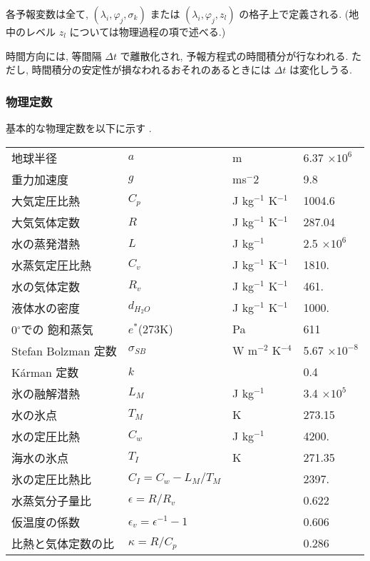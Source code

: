 各予報変数は全て, $(\lambda_i, \varphi_j, \sigma_k)$
または $(\lambda_i, \varphi_j, z_l)$ の格子上で定義される.
(地中のレベル $z_l$ については物理過程の項で述べる.)

時間方向には, 等間隔 $\Delta t$ で離散化され,
予報方程式の時間積分が行なわれる.
ただし, 時間積分の安定性が損なわれるおそれのあるときには
$\Delta t$ は変化しうる.

\subsubsection{物理定数}

基本的な物理定数を以下に示す .

\begin{tabular}{llll}
地球半径         & $a$         & m                    & 6.37 $\times 10^6$ \\
重力加速度       & $g$         & ms$^-2$              & 9.8                \\
大気定圧比熱     & $C_p$       & J kg$^{-1}$ K$^{-1}$ & 1004.6             \\
大気気体定数     & $R$         & J kg$^{-1}$ K$^{-1}$ & 287.04             \\
水の蒸発潜熱     & $L$         & J kg$^{-1}$          & 2.5 $\times 10^6$  \\
水蒸気定圧比熱   & $C_v$       & J kg$^{-1}$ K$^{-1}$ & 1810.              \\
水の気体定数     & $R_v$       & J kg$^{-1}$ K$^{-1}$ & 461.               \\
液体水の密度     & $d_{H_2O}$  & J kg$^{-1}$ K$^{-1}$ & 1000.              \\
0$^{\circ}$での
飽和蒸気         & $e^*$(273K) & Pa                   & 611                \\
Stefan Bolzman
定数             & $\sigma_{SB}$  
                               & W m$^{-2}$ K$^{-4}$  & 5.67 
                                                          $\times 10^{-8}$ \\
K\'{a}rman 定数  & $k$         &                      & 0.4                \\
氷の融解潜熱     & $L_M$       & J kg$^{-1}$          & 3.4 $\times 10^5$  \\
水の氷点         & $T_M$       & K                    & 273.15 \\
水の定圧比熱     & $C_w$       & J kg$^{-1}$          & 4200.  \\
海水の氷点       & $T_I$       & K                    & 271.35 \\
氷の定圧比熱比   & $C_I  = C_w - L_M/T_M$
                               &                      & 2397.              \\
水蒸気分子量比   & $\epsilon  = R/R_v$
                               &                      & 0.622              \\
仮温度の係数     & $\epsilon_v = \epsilon^{-1} - 1$
                               &                      & 0.606              \\
比熱と気体定数の比
                 & $\kappa = R/C_p$
                               &                      & 0.286              \\
\end{tabular}


